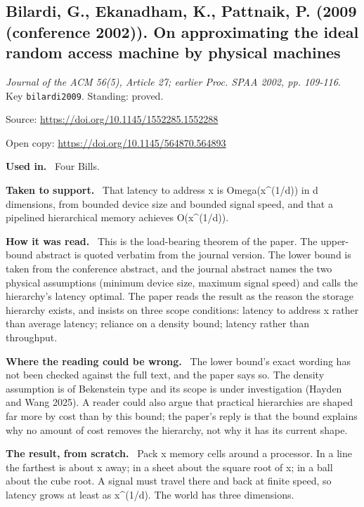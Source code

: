 \documentclass[11pt,oneside]{article}
\newcommand{\field}[1]{\par\noindent\textbf{\color{accent}#1.}\ }
\begin{document}
\hypertarget{src:bilardi2009}{}
\subsection*{Bilardi, G., Ekanadham, K., Pattnaik, P. (2009 (conference 2002)). On approximating the ideal random access machine by physical machines}
\noindent\small\emph{Journal of the ACM 56(5), Article 27; earlier Proc. SPAA 2002, pp. 109-116}. Key \texttt{bilardi2009}. Standing: proved.
\par\noindent\small Source: \url{https://doi.org/10.1145/1552285.1552288}
\par\noindent\small Open copy: \url{https://doi.org/10.1145/564870.564893}
\normalsize
\field{Used in} Four Bills.
\field{Taken to support} That latency to address x is Omega(x\textasciicircum{}(1/d)) in d dimensions, from bounded device size and bounded signal speed, and that a pipelined hierarchical memory achieves O(x\textasciicircum{}(1/d)).
\field{How it was read} This is the load-bearing theorem of the paper. The upper-bound abstract is quoted verbatim from the journal version. The lower bound is taken from the conference abstract, and the journal abstract names the two physical assumptions (minimum device size, maximum signal speed) and calls the hierarchy's latency optimal. The paper reads the result as the reason the storage hierarchy exists, and insists on three scope conditions: latency to address x rather than average latency; reliance on a density bound; latency rather than throughput.
\field{Where the reading could be wrong} The lower bound's exact wording has not been checked against the full text, and the paper says so. The density assumption is of Bekenstein type and its scope is under investigation (Hayden and Wang 2025). A reader could also argue that practical hierarchies are shaped far more by cost than by this bound; the paper's reply is that the bound explains why no amount of cost removes the hierarchy, not why it has its current shape.
\field{The result, from scratch} Pack x memory cells around a processor. In a line the farthest is about x away; in a sheet about the square root of x; in a ball about the cube root. A signal must travel there and back at finite speed, so latency grows at least as x\textasciicircum{}(1/d). The world has three dimensions.

\hypertarget{src:bozkurt2017}{}
\end{document}
